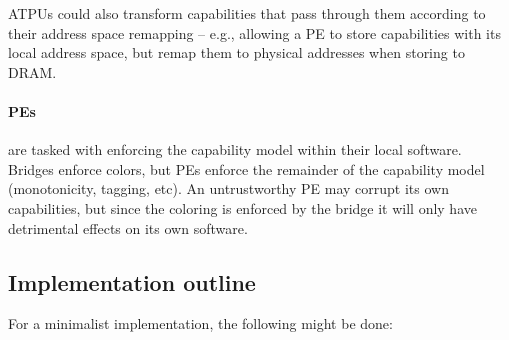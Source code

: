 ATPUs could also transform capabilities that pass through them according to their address space remapping -- e.g., allowing a PE to store capabilities with its local address space, but remap them to physical addresses when storing to DRAM.

\paragraph{PEs} are tasked with enforcing the capability model within their local software.  Bridges enforce colors, but PEs enforce the remainder of the capability model (monotonicity, tagging, etc).  An untrustworthy PE may corrupt its own capabilities, but since the coloring is enforced by the bridge it will only have detrimental effects on its own software.

\subsection{Implementation outline}
For a minimalist implementation, the following might be done:

